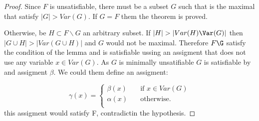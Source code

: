 \begin{proof}
  Since $F$ is unsatisfiable, there must be a subset $G$ such that is the maximal that satisfy $|G| > Var(G)$. If $G=F$ them the theorem is proved.


  Otherwise, be $H \subset F\backslash G$ an arbitrary subset. If $|H| > |Var(H)\Var(G)|$ then $|G \cup H| > |Var(G\cup H)|$ and $G$ would not be maximal.  Therefore $F\G$ satisfy the condition of the lemma and is satisfiable ussing an assigment that does not use any variable $x \in Var(G)$. As $G$ is minimally unsatifiable $G$ is satisfiable by and assigment $\beta$. We could them define an assigment:

  \[   
\gamma(x) = 
     \begin{cases}
       \beta(x) &\quad\text{if } x \in Var(G)\\
       \alpha(x) &\quad\text{otherwise.} \\ 
     \end{cases}
   \]
this assigment would satisfy F, contradictin the hypothesis.
\end{proof}




